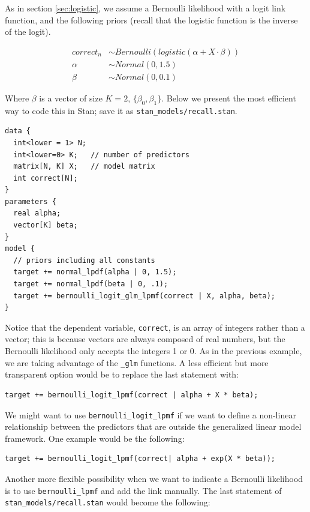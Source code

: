 \documentclass[12pt,]{krantz}
\theoremstyle{definition}
\theoremstyle{definition}
\theoremstyle{definition}
\theoremstyle{remark}
\begin{document}
As in section \ref{sec:logistic}, we assume a Bernoulli likelihood with a logit link function, and the following priors (recall that the logistic function is the inverse of the logit).

\begin{equation}
\begin{aligned}
correct_n &\sim Bernoulli( logistic(\alpha + X \cdot \beta))\\
\alpha &\sim Normal(0, 1.5) \\
\beta &\sim Normal(0, 0.1) 
\end{aligned}
\end{equation}

Where \(\beta\) is a vector of size \(K = 2\), \(\{\beta_0, \beta_1\}\). Below we present the most efficient way to code this in Stan; save it as \texttt{stan\_models/recall.stan}.

\begin{verbatim}
data {
  int<lower = 1> N;
  int<lower=0> K;   // number of predictors
  matrix[N, K] X;   // model matrix
  int correct[N];
}
parameters {
  real alpha;
  vector[K] beta;
}
model {
  // priors including all constants
  target += normal_lpdf(alpha | 0, 1.5);
  target += normal_lpdf(beta | 0, .1);
  target += bernoulli_logit_glm_lpmf(correct | X, alpha, beta);
}
\end{verbatim}

Notice that the dependent variable, \texttt{correct}, is an array of integers rather than a vector; this is because vectors are always composed of real numbers, but the Bernoulli likelihood only accepts the integers 1 or 0. As in the previous example, we are taking advantage of the \texttt{\_glm} functions. A less efficient but more transparent option would be to replace the last statement with:

\begin{verbatim}
target += bernoulli_logit_lpmf(correct | alpha + X * beta);
\end{verbatim}

We might want to use \texttt{bernoulli\_logit\_lpmf} if we want to define a non-linear relationship between the predictors that are outside the generalized linear model framework. One example would be the following:

\begin{verbatim}
target += bernoulli_logit_lpmf(correct| alpha + exp(X * beta));
\end{verbatim}

Another more flexible possibility when we want to indicate a Bernoulli likelihood is to use \texttt{bernoulli\_lpmf} and add the link manually. The last statement of \texttt{stan\_models/recall.stan} would become the following:
\end{document}
